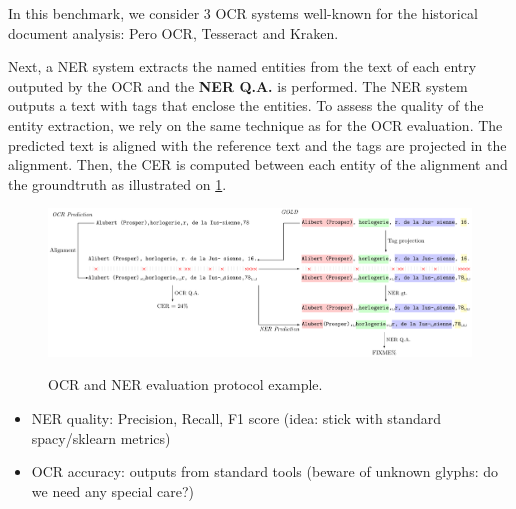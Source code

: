 In this benchmark, we consider 3 OCR systems well-known for the historical document analysis: Pero OCR, Tesseract and Kraken. 



Next, a NER system extracts the named entities from the text of each entry outputed by the OCR and the \textbf{NER Q.A.}
is performed. The NER system outputs a text with tags that enclose the entities. To assess the quality of the entity
extraction, we rely on the same technique as for the OCR evaluation. The predicted text is aligned with the reference
text and the tags are projected in the alignment. Then, the CER  is computed between each entity of the alignment and the
groundtruth as illustrated on \cref{fig.eval-ocr-ner}.


\begin{figure}[tb]
    \includegraphics[width=\linewidth]{figs/eval-ocr-ner.pdf}
    \label{fig.eval-ocr-ner}
    \caption{OCR and NER evaluation protocol example.}
\end{figure}





\begin{itemize}
    \item NER quality: Precision, Recall, F1 score (idea: stick with standard spacy/sklearn metrics) 
    \item OCR accuracy: outputs from standard tools (beware of unknown glyphs: do we need any special care?) 
    
\end{itemize}

